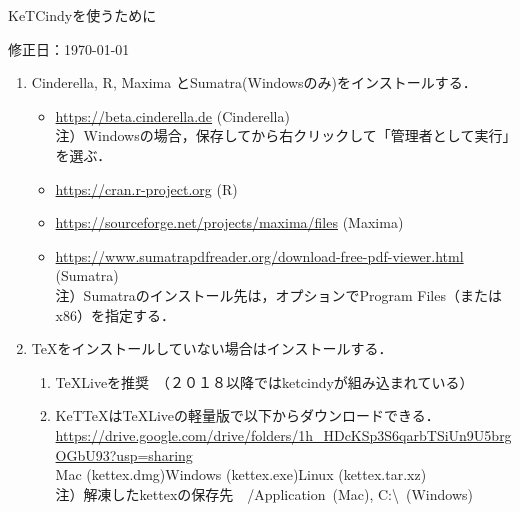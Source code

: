 \documentclass{ujarticle}
\begin{document}
\begin{center}
KeTCindyを使うために
\end{center}

\vspace{-5mm}

\hfill 修正日：\today

\begin{enumerate}[\bf\large 1.]
\item Cinderella, R, Maxima とSumatra(Windowsのみ)をインストールする．\vspace{-2mm}

 \begin{itemize}
 \item \url{https://beta.cinderella.de}  (Cinderella)\\
\hspace*{6mm}注）Windowsの場合，保存してから右クリックして「管理者として実行」を選ぶ．
 \item \url{https://cran.r-project.org}   (R)
 \item \url{https://sourceforge.net/projects/maxima/files}  (Maxima)
 \item \url{https://www.sumatrapdfreader.org/download-free-pdf-viewer.html} (Sumatra)\\
\hspace*{6mm}注）Sumatraのインストール先は，オプションでProgram Files（またはx86）を指定する．

 \end{itemize}
\item TeXをインストールしていない場合はインストールする．\vspace{-2mm}
 \begin{enumerate}[(1)]
 \item TeXLiveを推奨　（２０１８以降ではketcindyが組み込まれている）
 \item KeTTeXはTeXLiveの軽量版で以下からダウンロードできる．\\
\hspace*{3mm}\url{https://drive.google.com/drive/folders/1h_HDcKSp3S6qarbTSiUn9U5brgOGbU93?usp=sharing}\\
\hspace*{12mm}Mac (kettex.dmg)\hspace{3mm}Windows (kettex.exe)\hspace*{3mm}Linux (kettex.tar.xz)\\
    \hspace*{6mm}注）解凍したkettexの保存先　/Application\ (Mac), C:\textbackslash\ (Windows)


\end{enumerate}
\end{enumerate}
\end{document}
